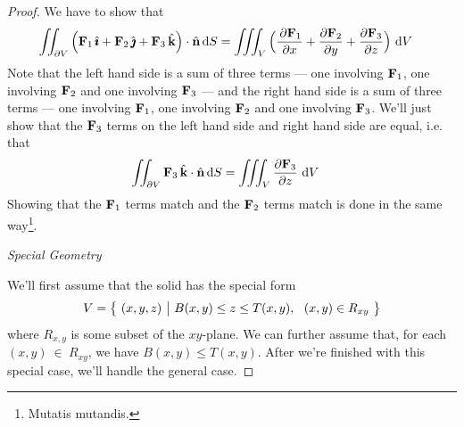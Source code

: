 \begin{proof}
We have to show that
\begin{align*}
\iint_{\partial V} \Big(
     \mathbf{F}_1\,\hat{\pmb{\imath}} + \mathbf{F}_2\,\hat{\pmb{\jmath}} + \mathbf{F}_3\,\hat{\mathbf{k}}\Big)
     \cdot\hat{\mathbf{n}}\,\mathrm{d}S
&=\iiint_V\Big(
     \frac{\,\partial \mathbf{F}_1}{\partial x}
     +\frac{\partial \mathbf{F}_2}{\partial y}
     +\frac{\partial \mathbf{F}_3}{\partial z}\Big)
     \ \mathrm{d}V 
\end{align*}
Note that the left hand side is a sum of three terms --- one involving $\mathbf{F}_1$,
one involving $\mathbf{F}_2$ and one involving $\mathbf{F}_3$ ---
and the right hand side is a sum of three terms --- one involving $\mathbf{F}_1$,
one involving $\mathbf{F}_2$ and one involving $\mathbf{F}_3$. We'll  just show that
the $\mathbf{F}_3$ terms on the left hand side and right hand side are equal, i.e. 
that
\begin{align*}
\iint_{\partial V}  \mathbf{F}_3\,\hat{\mathbf{k}} \cdot\hat{\mathbf{n}}\,\mathrm{d}S
&=\iiint_V
     \frac{\partial \mathbf{F}_3}{\partial z}
     \ \mathrm{d}V 
\end{align*}
Showing that the $\mathbf{F}_1$ terms match and the $\mathbf{F}_2$ terms match is done 
in the same way\footnote{Mutatis mutandis.}.

\medskip
\noindent \emph{Special Geometry}

We'll first assume that the solid has the special form
\begin{equation*}
V = \Set{(x,y,z)}{ B(x,y)\le z\le T(x,y),\ \ (x,y)\in R_{xy}}
\end{equation*}
where $R_{x,y}$ is some subset of the $xy$-plane. We can further assume
that, for each $(x,y)~\in~R_{xy}$, we have $B(x,y)\le  T(x,y)$.
After we're finished with this special case, we'll handle the general case.



\end{proof}
